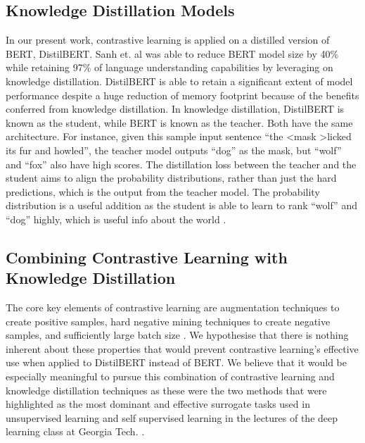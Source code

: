 \documentclass[10pt,twocolumn,letterpaper]{article}
\begin{document}
\subsection{Knowledge Distillation Models}

In our present work, contrastive learning is applied on a distilled version of BERT, DistilBERT. Sanh et. al \cite{1910.01108} was able to reduce BERT model size by 40\% while retaining 97\% of language understanding capabilities by leveraging on knowledge distillation. DistilBERT is able to retain a significant extent of model performance despite a huge reduction of memory footprint because of the benefits conferred from knowledge distillation. In knowledge distillation, DistilBERT is known as the student, while BERT is known as the teacher. Both have the same architecture. For instance, given this sample input sentence ``the \textless mask \textgreater licked its fur and howled'', the teacher model outputs ``dog'' as the mask, but ``wolf'' and ``fox'' also have high scores. The distillation loss between the teacher and the student aims to align the probability distributions, rather than just the hard predictions, which is the output from the teacher model. The probability distribution is a useful addition as the student is able to learn to rank ``wolf'' and ``dog'' highly, which is useful info about the world \cite{gatech2}.

\subsection{Combining Contrastive Learning with Knowledge Distillation}

The core key elements of contrastive learning are augmentation techniques to create positive samples, hard negative mining techniques to create negative samples, and sufficiently large batch size \cite{2002.05709}. We hypothesise that there is nothing inherent about these properties that would prevent contrastive learning’s effective use when applied to DistilBERT instead of BERT.  We believe that it would be especially meaningful to pursue this combination of contrastive learning and knowledge distillation techniques as these were the two methods that were highlighted as the most dominant and effective surrogate tasks used in unsupervised learning and self supervised learning in the lectures of the deep learning class at Georgia Tech. \cite{gatech}.
\end{document}
